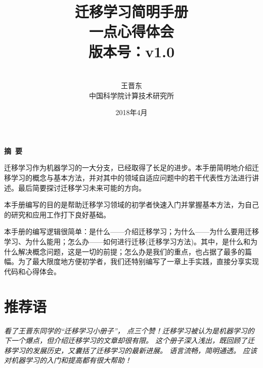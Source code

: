 \documentclass[a4paper]{article}
\begin{document}
\pagestyle{main}    %

\renewcommand{\refname}{参考文献} 
\renewcommand{\figurename}{图}
\renewcommand{\tablename}{表}
\renewcommand{\contentsname}{目录}
\renewcommand{\today}{\number\year 年 \number\month 月 \number\day 日}


\title{{\Huge 迁移学习简明手册{\large\linebreak\\}}{\Large 一点心得体会\\版本号：v1.0\linebreak\linebreak
}}
\author{\\
  王晋东\\中国科学院计算技术研究所}
\date{2018年4月}
\maketitle
\thispagestyle{empty}

\newpage

\thispagestyle{empty}
\begin{center}
{\Large\bf{摘\ 要\\}}
\end{center}

迁移学习作为机器学习的一大分支，已经取得了长足的进步。本手册简明地介绍迁移学习的概念与基本方法，并对其中的领域自适应问题中的若干代表性方法进行讲述。最后简要探讨迁移学习未来可能的方向。

本手册编写的目的是帮助迁移学习领域的初学者快速入门并掌握基本方法，为自己的研究和应用工作打下良好基础。

本手册的编写逻辑很简单：是什么——介绍迁移学习；为什么——为什么要用迁移学习、为什么能用；怎么办——如何进行迁移(迁移学习方法)。其中，是什么和为什么解决概念问题，这是一切的前提；怎么办是我们的重点，也占据了最多的篇幅。为了最大限度地方便初学者，我们还特别编写了一章上手实践，直接分享实现代码和心得体会。
\newpage

\thispagestyle{empty}
\section*{推荐语}

\textit{看了王晋东同学的“迁移学习小册子”， 点三个赞！迁移学习被认为是机器学习的下一个爆点，但介绍迁移学习的文章却很有限。 这个册子深入浅出，既回顾了迁移学习的发展历史，又囊括了迁移学习的最新进展。 语言流畅，简明通透。 应该对机器学习的入门和提高都有很大帮助！}
\end{document}
